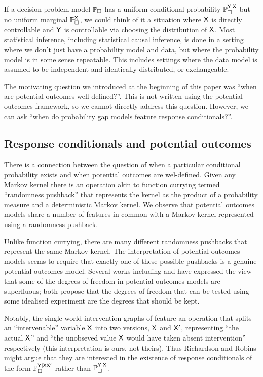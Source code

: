 If a decision problem model $\mathbb{P}_\square$ has a uniform conditional probability $\mathbb{P}_\square^{\mathsf{Y}|\mathsf{X}}$ but no uniform marginal $\mathbb{P}_\square^{\mathsf{X}}$, we could think of it a situation where $\mathsf{X}$ is directly controllable and $\mathsf{Y}$ is controllable via choosing the distribution of $\mathsf{X}$. Most statistical inference, including statistical causal inference, is done in a setting where we don't just have a probability model and data, but where the probability model is in some sense repeatable. This includes settings where the data model is assumed to be independent and identically distributed, or exchangeable.



The motivating question we introduced at the beginning of this paper was ``when are potential outcomes well-defined?''. This is not written using the potential outcomes framework, so we cannot directly address this question. However, we can ask ``when do probability gap models feature response conditionals?''.

\subsection{Response conditionals and potential outcomes}\label{sec:curry}

There is a connection between the question of when a particular conditional probability exists and when potential outcomes are wel-defined. Given any Markov kernel there is an operation akin to function currying termed ``randomness pushback'' that represents the kernel as the product of a probability measure and a deterministic Markov kernel. We observe that potential outcomes models share a number of features in common with a Markov kernel represented using a randomness pushback.

Unlike function currying, there are many different randomness pushbacks that represent the same Markov kernel. The interpretation of potential outcomes models seems to require that exactly one of these possible pushbacks is a genuine potential outcomes model. Several works including \citet{dawid_causal_2000} and \citet{richardson2013single} have expressed the view that some of the degrees of freedom in potential outcomes models are superfluous; both propose that the degrees of freedom that can be tested using some idealised experiment are the degrees that should be kept.

Notably, the single world intervention graphs of \citet{richardson2013single} feature an operation that splits an ``intervenable'' variable $\mathsf{X}$ into two versions, $\mathsf{X}$ and $\mathsf{X}'$, representing ``the actual $\mathsf{X}$'' and ``the unobseved value $\mathsf{X}$ would have taken absent intervention'' respectively (this interpretation is ours, not theirs). Thus Richardson and Robins might argue that they are interested in the existence of response conditionals of the form $\mathbb{P}_\square^{\mathsf{Y}|\mathsf{X}\mathsf{X}'}$ rather than $\mathbb{P}_{\square}^{\mathsf{Y}|\mathsf{X}}$. 

